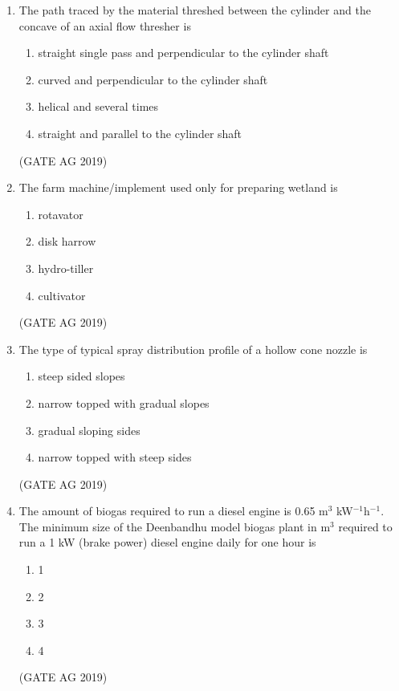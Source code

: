 \documentclass[journal,12pt,onecolumn]{IEEEtran}
\theoremstyle{remark}
\begin{document}
\begin{enumerate}
\item The path traced by the material threshed between the cylinder and the concave of an axial flow thresher is

\begin{enumerate}
    \item straight single pass and perpendicular to the cylinder shaft
    \item curved and perpendicular to the cylinder shaft
    \item helical and several times
    \item straight and parallel to the cylinder shaft
\end{enumerate}
\hfill{(GATE AG 2019)}


\item The farm machine/implement used only for preparing wetland is
\begin{multicols}{4}
\begin{enumerate}
    \item rotavator
    \item disk harrow
    \item hydro-tiller
    \item cultivator
\end{enumerate}
\end{multicols}
\hfill{(GATE AG 2019)}

\item The type of typical spray distribution profile of a hollow cone nozzle is
\begin{multicols}{4}
\begin{enumerate}
    \item steep sided slopes
    \item narrow topped with gradual slopes
    \item gradual sloping sides
    \item narrow topped with steep sides
\end{enumerate}
\end{multicols}
\hfill{(GATE AG 2019)}

\item The amount of biogas required to run a diesel engine is 0.65 m$^3$ kW$^{-1}$h$^{-1}$. The minimum size of the Deenbandhu model biogas plant in m$^3$ required to run a 1 kW (brake power) diesel engine daily for one hour is
\begin{multicols}{4}
\begin{enumerate}
    \item 1
    \item 2
    \item 3
    \item 4
\end{enumerate}
\end{multicols}
\hfill{(GATE AG 2019)}


\end{enumerate}
\end{document}
